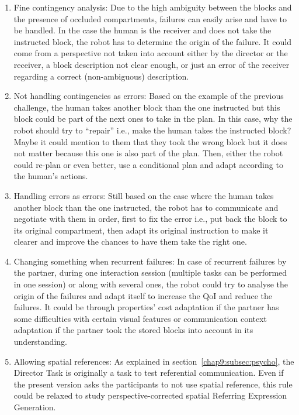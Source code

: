 \documentclass[a4paper,11pt,twoside]{StyleThese}
\begin{document}
\begin{enumerate}[leftmargin=* ,parsep=0cm,itemsep=0cm,topsep=0cm]
	\item Fine contingency analysis:  Due to the high ambiguity between the blocks and the presence of occluded compartments, failures can easily arise and have to be handled. In the case the human is the receiver and does not take the instructed block, the robot has to determine the origin of the failure. It could come from a perspective not taken into account either by the director or the receiver, a block description not clear enough, or just an error of the receiver regarding a correct (non-ambiguous) description.\label{chal:cont_analysis}
	\item Not handling contingencies as errors: Based on the example of the previous challenge, the human takes another block than the one instructed but this block could be part of the next ones to take in the plan. In this case, why the robot should try to ``repair'' i.e., make the human takes the instructed block? Maybe it could mention to them that they took the wrong block but it does not matter because this one is also part of the plan. Then, either the robot could re-plan or even better, use a conditional plan and adapt according to the human's actions.\label{chal:cont_not_errors}
	\item Handling errors as errors: Still based on the case where the human takes another block than the one instructed, the robot has to communicate and negotiate with them in order, first to fix the error i.e., put back the block to its original compartment, then adapt its original instruction to make it clearer and improve the chances to have them take the right one.\label{chal:cont_errors}
	\item Changing something when recurrent failures: In case of recurrent failures by the partner, during one interaction session (multiple tasks can be performed in one session) or along with several ones, the robot could try to analyse the origin of the failures and adapt itself to increase the QoI and reduce the failures. It could be through properties' cost adaptation if the partner has some difficulties with certain visual features or communication context adaptation if the partner took the stored blocks into account in its understanding.\label{chal:change}
	\item Allowing spatial references: As explained in section~\ref{chap9:subsec:psycho}, the Director Task is originally a task to test referential communication. Even if the present version asks the participants to not use spatial reference, this rule could be relaxed to study perspective-corrected spatial Referring Expression Generation.\label{chal:spatial_ref}

\end{enumerate}
\end{document}
